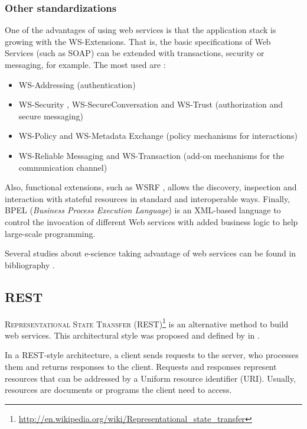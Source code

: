 \subsubsection{Other standardizations} One of the advantages of using
web services %
 is that the application stack is growing with the WS-Extensions. That is, the basic specifications of Web Services (such as SOAP) can be extended with transactions, security or messaging, for example. The most used are \cite{Papazoglou2007SOA}:
\begin{itemize}
  \item WS-Addressing  (authentication)
  \item WS-Security , WS-SecureConversation  and WS-Trust  (authorization and secure messaging)
  \item WS-Policy and WS-Metadata Exchange (policy mechanisms for interactions)
  \item WS-Reliable Messaging  and WS-Transaction (add-on mechanisms for the communication channel)
\end{itemize}
Also, functional extensions, such as WSRF \cite{WSRF}, %
 allows the discovery, inspection and interaction with stateful resources in standard and interoperable ways. Finally, BPEL ({\em Business Process Execution Language})  \cite{BPEL} is an XML-based language to control the invocation of different Web services with added business logic to help large-scale programming.

Several studies about e-science taking advantage of web services can be found in bibliography \cite{Oinn04Taverna,davidson08workflows,Ludascher06Kepler,Perera06workflows}.

\subsection{REST}
\textsc{Representational State Transfer} (REST)\footnote{\url{http://en.wikipedia.org/wiki/Representational_state_transfer}} is an alternative method to build web services.
This architectural style %
was proposed and defined by  in \cite{Fielding2002}.

In a REST-style architecture, a client sends requests to the server, who processes them and returns responses to the client.
Requests and responses represent resources that can be addressed by a Uniform resource identifier (URI). Usually, resources are documents or programs the client need to access.

